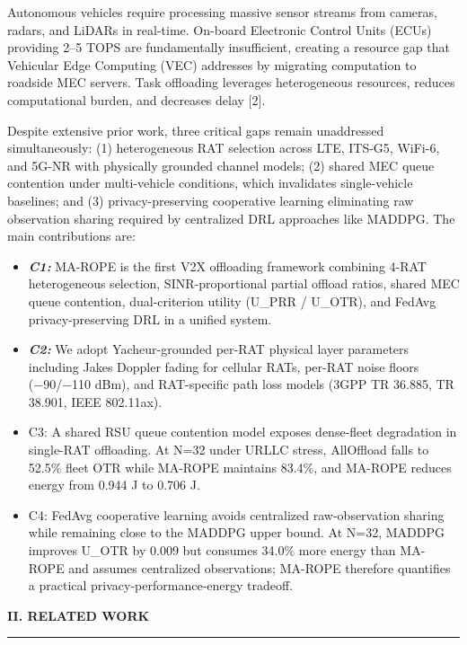\documentclass[journal,10pt,twocolumn]{IEEEtran}
\begin{document}
Autonomous vehicles require processing massive sensor streams from
cameras, radars, and LiDARs in real-time. On-board Electronic Control
Units (ECUs) providing 2--5 TOPS are fundamentally insufficient,
creating a resource gap that Vehicular Edge Computing (VEC) addresses by
migrating computation to roadside MEC servers. Task offloading leverages
heterogeneous resources, reduces computational burden, and decreases
delay {[}2{]}.

Despite extensive prior work, three critical gaps remain unaddressed
simultaneously: (1) heterogeneous RAT selection across LTE, ITS-G5,
WiFi-6, and 5G-NR with physically grounded channel models; (2) shared
MEC queue contention under multi-vehicle conditions, which invalidates
single-vehicle baselines; and (3) privacy-preserving cooperative
learning eliminating raw observation sharing required by centralized DRL
approaches like MADDPG. The main contributions are:

\begin{itemize}
\item
  \emph{\textbf{C1:}} MA-ROPE is the first V2X offloading framework
  combining 4-RAT heterogeneous selection, SINR-proportional partial
  offload ratios, shared MEC queue contention, dual-criterion utility
  (U\_PRR / U\_OTR), and FedAvg privacy-preserving DRL in a unified
  system.
\item
  \emph{\textbf{C2:}} We adopt Yacheur-grounded per-RAT physical layer
  parameters including Jakes Doppler fading for cellular RATs, per-RAT
  noise floors (−90/−110 dBm), and RAT-specific path loss models (3GPP
  TR 36.885, TR 38.901, IEEE 802.11ax).
\item
  C3: A shared RSU queue contention model exposes dense-fleet
  degradation in single-RAT offloading. At N=32 under URLLC stress,
  AllOffload falls to 52.5\% fleet OTR while MA-ROPE maintains 83.4\%,
  and MA-ROPE reduces energy from 0.944 J to 0.706 J.
\item
  C4: FedAvg cooperative learning avoids centralized raw-observation
  sharing while remaining close to the MADDPG upper bound. At N=32,
  MADDPG improves U\_OTR by 0.009 but consumes 34.0\% more energy than
  MA-ROPE and assumes centralized observations; MA-ROPE therefore
  quantifies a practical privacy-performance-energy tradeoff.
\end{itemize}

\textbf{II. RELATED WORK}

\begin{center}\rule{0.5\linewidth}{0.5pt}\end{center}
\end{document}
